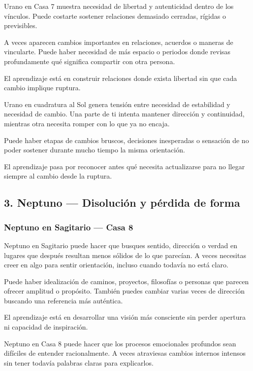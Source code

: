 \documentclass[11pt,a4paper]{article}
\begin{document}
Urano en Casa 7 muestra necesidad de libertad y autenticidad dentro de los vínculos. Puede costarte sostener relaciones demasiado cerradas, rígidas o previsibles.

A veces aparecen cambios importantes en relaciones, acuerdos o maneras de vincularte. Puede haber necesidad de más espacio o periodos donde revisas profundamente qué significa compartir con otra persona.

El aprendizaje está en construir relaciones donde exista libertad sin que cada cambio implique ruptura.

Urano en cuadratura al Sol genera tensión entre necesidad de estabilidad y necesidad de cambio. Una parte de ti intenta mantener dirección y continuidad, mientras otra necesita romper con lo que ya no encaja.

Puede haber etapas de cambios bruscos, decisiones inesperadas o sensación de no poder sostener durante mucho tiempo la misma orientación.

El aprendizaje pasa por reconocer antes qué necesita actualizarse para no llegar siempre al cambio desde la ruptura.

\vspace{0.8cm}

\subsection{3. Neptuno — Disolución y pérdida de forma}

\subsubsection*{Neptuno en Sagitario — Casa 8}

Neptuno en Sagitario puede hacer que busques sentido, dirección o verdad en lugares que después resultan menos sólidos de lo que parecían. A veces necesitas creer en algo para sentir orientación, incluso cuando todavía no está claro.

Puede haber idealización de caminos, proyectos, filosofías o personas que parecen ofrecer amplitud o propósito. También puedes cambiar varias veces de dirección buscando una referencia más auténtica.

El aprendizaje está en desarrollar una visión más consciente sin perder apertura ni capacidad de inspiración.

Neptuno en Casa 8 puede hacer que los procesos emocionales profundos sean difíciles de entender racionalmente. A veces atraviesas cambios internos intensos sin tener todavía palabras claras para explicarlos.
\end{document}
